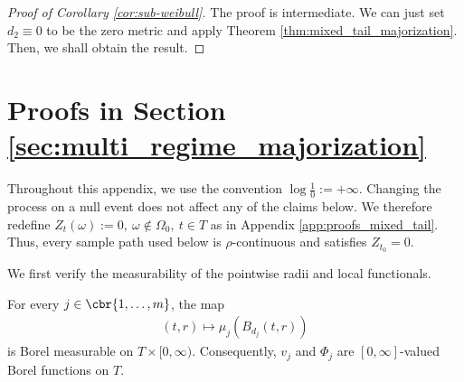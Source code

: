 \documentclass[11pt]{article}
\begin{document}
\begin{proof}[Proof of Corollary \ref{cor:sub-weibull}]
    The proof is intermediate. We can just set $d_2\equiv 0$ to be the zero metric and apply Theorem \ref{thm:mixed_tail_majorization}. Then, we shall obtain the result.
\end{proof}

\section{Proofs in Section \ref{sec:multi_regime_majorization}}
\label{app:proofs_multi_regime}

Throughout this appendix, we use the convention $\log\frac{1}{0}:=+\infty$. Changing the process on a null event does not affect any of the claims
below. We therefore redefine $Z_t(\omega):=0,
\ \omega\notin\Omega_0,\ t\in T$ as in Appendix \ref{app:proofs_mixed_tail}.
Thus, every sample path used below is $\rho$-continuous and satisfies
$Z_{t_0}=0$.

We first verify the measurability of the pointwise radii and local
functionals.

\begin{lemma}
\label{lem:multi_regime_measurability}
For every $j\in\cbr{1,\ldots,m}$, the map
\begin{align*}
(t,r)
\longmapsto
\mu_j(B_{d_j}(t,r))
\end{align*}
is Borel measurable on $T\times[0,\infty)$. Consequently, $v_j$ and
$\Phi_j$ are $[0,\infty]$-valued Borel functions on $T$.
\end{lemma}
\end{document}
